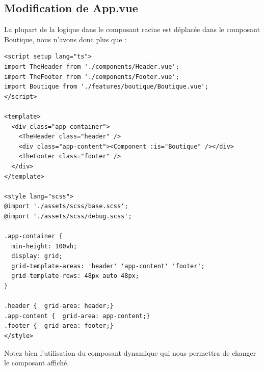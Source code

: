 \subsection{Modification de App.vue}
La plupart de la logique dans le composant racine est déplacée dans le composant Boutique, nous n'avons donc plus que :
\begin{verbatim}
<script setup lang="ts">
import TheHeader from './components/Header.vue';
import TheFooter from './components/Footer.vue';
import Boutique from './features/boutique/Boutique.vue';
</script>

<template>
  <div class="app-container">
    <TheHeader class="header" />
    <div class="app-content"><Component :is="Boutique" /></div>
    <TheFooter class="footer" />
  </div>
</template>

<style lang="scss">
@import './assets/scss/base.scss';
@import './assets/scss/debug.scss';

.app-container {
  min-height: 100vh;
  display: grid;
  grid-template-areas: 'header' 'app-content' 'footer';
  grid-template-rows: 48px auto 48px;
}

.header {  grid-area: header;}
.app-content {  grid-area: app-content;}
.footer {  grid-area: footer;}
</style>
\end{verbatim}

Notez bien l'utilisation du composant dynamique qui nous permettra de changer le composant affiché.

